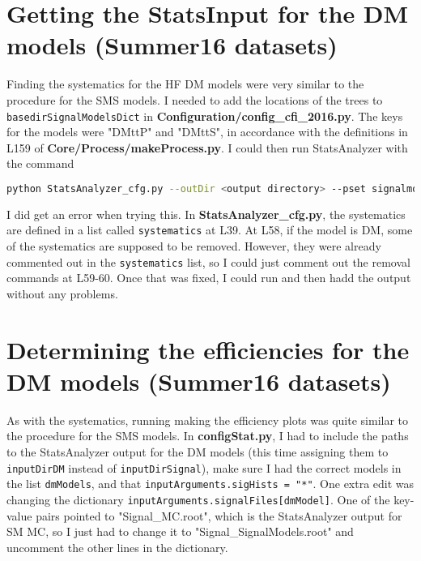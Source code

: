 \section{Getting the StatsInput for the DM models (Summer16 datasets)}

Finding the systematics for the HF DM models were very similar to the procedure for the SMS models. I needed to add the locations of the trees to \verb!basedirSignalModelsDict! in \textbf{Configuration/config\_cfi\_2016.py}. The keys for the models were "DMttP" and "DMttS", in accordance with the definitions in L159 of \textbf{Core/Process/makeProcess.py}. I could then run StatsAnalyzer with the command 

\begin{lstlisting}[belowskip=-0.7cm, language=sh, numbers=none]
python StatsAnalyzer_cfg.py --outDir <output directory> --pset signalmodel --signalModel <key from config_cfi_2016, no other prefix/suffix> --nCores <number of cores> --dataMC mc
\end{lstlisting}

I did get an error when trying this. In \textbf{StatsAnalyzer\_cfg.py}, the systematics are defined in a list called \verb!systematics! at L39. At L58, if the model is DM, some of the systematics are supposed to be removed. However, they were already commented out in the \verb!systematics! list, so I could just comment out the removal commands at L59-60. Once that was fixed, I could run and then hadd the output without any problems.


\section{Determining the efficiencies for the DM models (Summer16 datasets)}

As with the systematics, running making the efficiency plots was quite similar to the procedure for the SMS models. In \textbf{configStat.py}, I had to include the paths to the StatsAnalyzer output for the DM models (this time assigning them to \verb!inputDirDM! instead of \verb!inputDirSignal!), make sure I had the correct models in the list \verb!dmModels!, and that \texttt{inputArguments.sigHists = "*"}. One extra edit was changing the dictionary \texttt{inputArguments.signalFiles[dmModel]}. One of the key-value pairs pointed to "Signal\_MC.root", which is the StatsAnalyzer output for SM MC, so I just had to change it to "Signal\_SignalModels.root" and uncomment the other lines in the dictionary.


